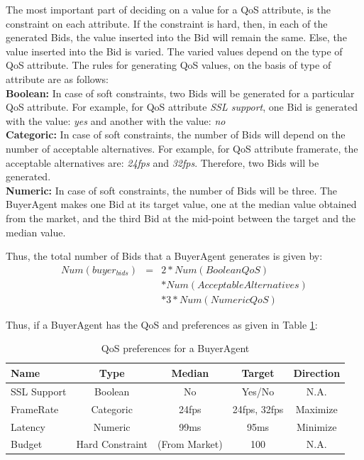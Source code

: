\documentclass[10pt,journal,compsoc]{IEEEtran}
\begin{document}
The most important part of deciding on a value for a QoS attribute, is the constraint on each attribute. If the constraint is hard, then, in each of the generated Bids, the value inserted into the Bid will remain the same. Else, the value inserted into the Bid is varied. The varied values depend on the type of QoS attribute. The rules for generating QoS values, on the basis of type of attribute are as follows:\\
\textbf{Boolean:} In case of soft constraints, two Bids will be generated for a particular QoS attribute. For example, for QoS attribute \textit{SSL support}, one Bid is generated with the value: \textit{yes} and another with the value: \textit{no}\\
\textbf{Categoric:} In case of soft constraints, the number of Bids will depend on the number of acceptable alternatives. For example, for QoS attribute {framerate}, the acceptable alternatives are: \textit{24fps} and \textit{32fps}. Therefore, two Bids will be generated. \\
\textbf{Numeric:} In case of soft constraints, the number of Bids will be three. The BuyerAgent makes one Bid at its target value, one at the median value obtained from the market, and the third Bid at the mid-point between the target and the median value.

Thus, the total number of Bids that a BuyerAgent generates is given by:
\setlength{\arraycolsep}{0.0em}
\begin{eqnarray}
Num(buyer_{bids})&{} = &{ }2 * Num(BooleanQoS)\nonumber\\
						  && *{ }  Num(AcceptableAlternatives)\nonumber\\
						  && *{ } 3 * Num(NumericQoS)
\end{eqnarray}
\setlength{\arraycolsep}{5pt}

Thus, if a BuyerAgent has the QoS and preferences as given in Table \ref{tbl:sample_qos_preferences}:

\begin{table}
\centering
\begin{tabular}{lcccc}
\toprule
\textbf{Name} & \textbf{Type} & \textbf{Median} & \textbf{Target} & \textbf{Direction} \\ 
\midrule
SSL Support & Boolean & No & Yes/No & N.A. \\ 
FrameRate & Categoric & 24fps & 24fps, 32fps & Maximize \\ 
Latency & Numeric & 99ms & 95ms	& Minimize \\ 
Budget & Hard Constraint & (From Market) &  100 & N.A. \\ 
\bottomrule
\end{tabular}
\caption{QoS preferences for a BuyerAgent \label{tbl:sample_qos_preferences}}
\end{table}
\end{document}
